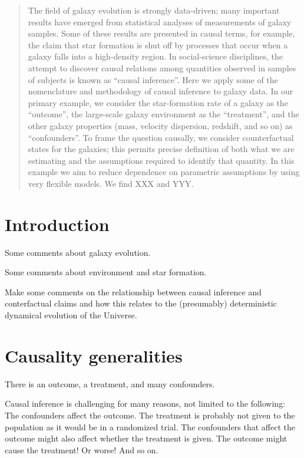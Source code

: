 \documentclass[12pt, letterpaper, preprint]{aastex}
\begin{document}
\begin{abstract}
The field of galaxy evolution is strongly data-driven; many important
results have emerged from statistical analyses of measurements of
galaxy samples.
Some of these results are presented in causal terms, for example, the
claim that star formation is shut off by processes that occur when a
galaxy falls into a high-density region.
In social-science disciplines, the attempt to discover causal
relations among quantities observed in samples of subjects is known as
``causal inference''.
Here we apply some of the nomenclature and methodology of
causal inference to galaxy data.
In our primary example, we consider the star-formation rate of a
galaxy as the ``outcome'', the large-scale galaxy environment as the
``treatment'', and the other galaxy properties (mass, velocity
dispersion, redshift, and so on) as ``confounders''.
To frame the question causally, we consider counterfactual states for
the galaxies; this permits precise definition of both what we are
estimating and the assumptions required to identify that quantity.
In this example we aim to reduce dependence on parametric assumptions
by using very flexible models.
We find XXX and YYY.
\end{abstract}

\section{Introduction}

Some comments about galaxy evolution.

Some comments about environment and star formation.

Make some comments on the relationship between causal inference and
conterfactual claims and how this relates to the (presumably)
deterministic dynamical evolution of the Universe.

\section{Causality generalities}

There is an outcome, a treatment, and many confounders.

Causal inference is challenging for many reasons, not limited to the following:
The confounders affect the outcome.
The treatment is probably not given to the population as it would be in a randomized trial.
The confounders that affect the outcome might also affect whether the treatment is given.
The outcome might cause the treatment!  Or worse!
And so on.
\end{document}
